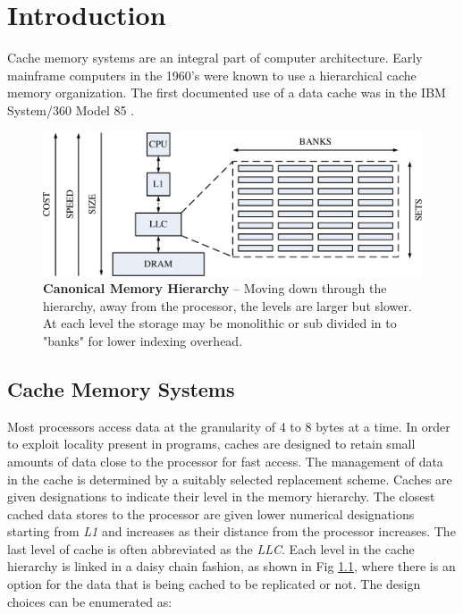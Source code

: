 
%
%

\chapter{Introduction}
\label{introduction}

Cache memory systems are an integral part of computer architecture. Early mainframe computers in the 1960's were known to use a hierarchical cache memory organization. The first documented use of a data cache was in the IBM System/360 Model 85 \cite{liptay68}. \\

\begin{figure}[ht]
  \begin{center}
    \includegraphics[width=\textwidth]{files/Figures/05-MemoryHierarchy.pdf}
    \caption[Canonical Memory Hierarchy]{\textbf{Canonical Memory Hierarchy} -- Moving down through the hierarchy, away from the processor, the levels are larger but slower. At each level the storage may be monolithic or sub divided in to "banks" for lower indexing overhead.}
    \label{fig:memory_hierarchy}
  \end{center}
\end{figure}

\section{Cache Memory Systems}
\label{sec:cache_memory_systems}
Most processors access data at the granularity of 4 to 8 bytes at a time. In order to exploit locality present in programs, caches are designed to retain small amounts of data close to the processor for fast access. The management of data in the cache is determined by a suitably selected replacement scheme. Caches are given designations to indicate their level in the memory hierarchy. The closest cached data stores to the processor are given lower numerical designations starting from \textit{L1} and increases as their distance from the processor increases. The last level of cache is often abbreviated as the \textit{LLC}. Each level in the cache hierarchy is linked in a daisy chain fashion, as shown in Fig \ref{fig:memory_hierarchy}, where there is an option for the data that is being cached to be replicated or not. The design choices can be enumerated as:

